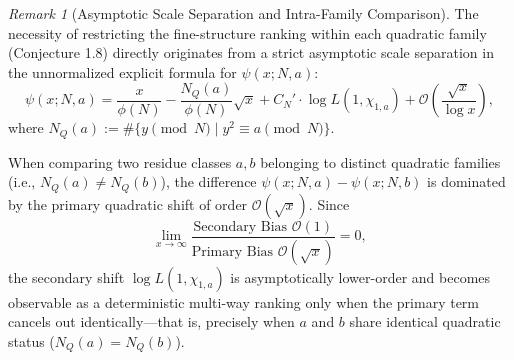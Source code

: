 \documentclass[12pt,reqno]{amsart}
\theoremstyle{definition}
\theoremstyle{remark}
\newtheorem{remark}[theorem]{Remark}
\numberwithin{equation}{section}
\begin{document}
\begin{remark}[Asymptotic Scale Separation and Intra-Family Comparison]\label{rem:psi}
The necessity of restricting the fine-structure ranking within each quadratic family (Conjecture 1.8) directly originates from a strict asymptotic scale separation in the unnormalized explicit formula for $\psi(x; N, a)$:
\[
\psi(x; N, a) = \frac{x}{\phi(N)} - \frac{N_Q(a)}{\phi(N)} \sqrt{x} + C_N' \cdot \log L(1, \chi_{1,a}) + \mathcal{O}\left( \frac{\sqrt{x}}{\log x} \right),
\]
where $N_Q(a) := \#\{ y \pmod N \mid y^2 \equiv a \pmod N \}$. 

When comparing two residue classes $a, b$ belonging to distinct quadratic families (i.e., $N_Q(a) \neq N_Q(b)$), the difference $\psi(x; N, a) - \psi(x; N, b)$ is dominated by the primary quadratic shift of order $\mathcal{O}(\sqrt{x})$. Since
\[
\lim_{x \to \infty} \frac{\text{Secondary Bias }\mathcal{O}(1)}{\text{Primary Bias }\mathcal{O}(\sqrt{x})} = 0,
\]
the secondary shift $\log L(1, \chi_{1,a})$ is asymptotically lower-order and becomes observable as a deterministic multi-way ranking only when the primary term cancels out identically—that is, precisely when $a$ and $b$ share identical quadratic status ($N_Q(a) = N_Q(b)$).
\end{remark}
\end{document}
